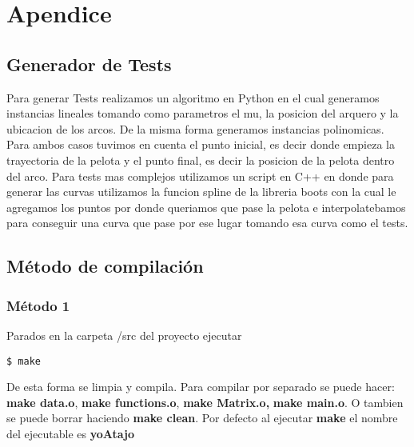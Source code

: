\section{Apendice}

\subsection{Generador de Tests}
Para generar Tests realizamos un algoritmo en Python en el cual generamos instancias lineales tomando como parametros el mu, la posicion del arquero y la ubicacion de los arcos. De la misma forma generamos instancias polinomicas. Para ambos casos tuvimos en cuenta el punto inicial, es decir donde empieza la trayectoria de la pelota y el punto final, es decir la posicion de la pelota dentro del arco.
Para tests mas complejos utilizamos un script en C++ en donde para generar las curvas utilizamos la funcion spline de la libreria boots con la cual le agregamos los puntos por donde queriamos que pase la pelota e interpolatebamos para conseguir una curva que pase por ese lugar tomando esa curva como el tests.



\subsection{M\'etodo de compilaci\'on}

\subsubsection{M\'etodo 1}
\begin{framed}
Parados en la carpeta /src del proyecto ejecutar 
\begin{verbatim}
$ make
\end{verbatim}
De esta forma se limpia y compila.
Para compilar por separado se puede hacer:  \textbf{make data.o}, \textbf{make functions.o}, \textbf{make Matrix.o,} \textbf{make main.o}. O tambien se puede borrar haciendo \textbf{make clean}. Por defecto al ejecutar \textbf{make} el nombre del ejecutable es \textbf{yoAtajo}
\end{framed}

